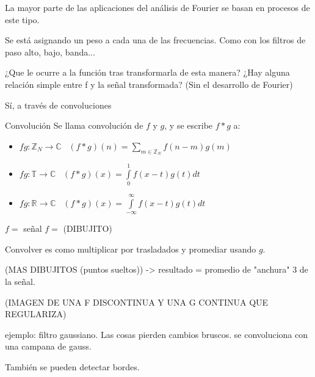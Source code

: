La mayor parte de las aplicaciones del análisis de Fourier se basan en procesos de este tipo.

Se está asignando un peso a cada una de las frecuencias. Como con los filtros de paso alto, bajo, banda...

¿Que le ocurre a la función tras transformarla de esta manera? ¿Hay alguna relación simple entre f y la señal transformada? (Sin el desarrollo de Fourier)

Sí, a través de convoluciones

\begin{defn}{Convolución}
	Se llama convolución de $f$ y $g$, y se escribe $f*g$ a:
	\begin{itemize}
		\item $fg :\mathbb{Z}_{N} \rightarrow \mathbb{C} \;\;\; (f * g)(n) = \sum\limits_{m \in \mathbb{Z}_{N}} f(n-m)g(m)$
		\item $fg :\mathbb{T} \rightarrow \mathbb{C} \;\;\; (f * g)(x) = \int\limits^{1}_{0} f(x-t)g(t)dt$
		\item $fg :\mathbb{R} \rightarrow \mathbb{C} \;\;\; (f * g)(x) = \int\limits^{\infty}_{-\infty} f(x-t)g(t)dt$
	\end{itemize}

\end{defn}

\begin{obs}

$f =$ señal $f = $ (DIBUJITO)

Convolver es como multiplicar por trasladados y promediar usando $g$.


(MAS DIBUJITOS (puntos sueltos)) -> resultado = promedio de "anchura" 3 de la señal.


(IMAGEN DE UNA F DISCONTINUA Y UNA G CONTINUA QUE REGULARIZA)



ejemplo: filtro gaussiano. Las cosas pierden cambios bruscos. se convoluciona con una campana de gauss.

También se pueden detectar bordes.

\end{obs}


